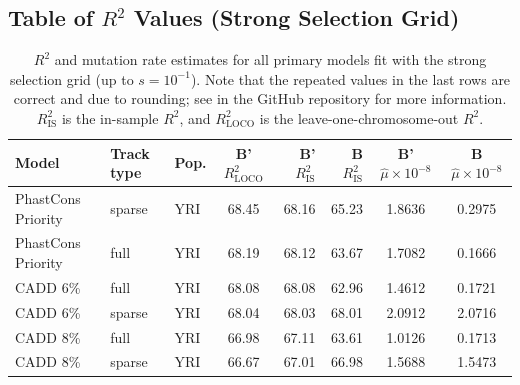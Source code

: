 \documentclass[11pt]{article}
\begin{document}
\subsection{Table of $R^2$ Values (Strong Selection Grid)}
\label{supp:tbl-r2-strongsel}
\begin{table}
\centering

\caption{$R^2$ and mutation rate estimates for all primary models fit with the
    strong selection grid (up to $s=10^{-1}$). Note that the repeated values in
    the last rows are correct and due to rounding; see
     in the GitHub repository for more
information. $R_\text{IS}^2$ is the in-sample $R^2$, and $R_\text{LOCO}^2$ is
the leave-one-chromosome-out $R^2$. }

\begin{tabular}{lll|crr|cc}
    \textbf{Model} & \textbf{Track type} & \textbf{Pop.} & \textbf{B' $R_\text{LOCO}^2$} & \textbf{B' $R_\text{IS}^2$} & \textbf{B $R_\text{IS}^2$} & \textbf{B' $\hat{\mu} \times 10^{-8}$} & \textbf{B $\hat{\mu} \times 10^{-8}$} \\[0.5ex] 
\hline
\hline
PhastCons Priority &            sparse &          YRI &                        68.45 &             68.16 &            65.23 &                                 1.8636 &                                0.2975 \\
PhastCons Priority &              full &          YRI &                        68.19 &             68.12 &            63.67 &                                 1.7082 &                                0.1666 \\
          CADD 6\% &              full &          YRI &                        68.08 &             68.08 &            62.96 &                                 1.4612 &                                0.1721 \\
          CADD 6\% &            sparse &          YRI &                        68.04 &             68.03 &            68.01 &                                 2.0912 &                                2.0716 \\
          CADD 8\% &              full &          YRI &                        66.98 &             67.11 &            63.61 &                                 1.0126 &                                0.1713 \\
          CADD 8\% &            sparse &          YRI &                        66.67 &             67.01 &            66.98 &                                 1.5688 &                                1.5473 \\

\end{tabular}
\end{table}
\end{document}
